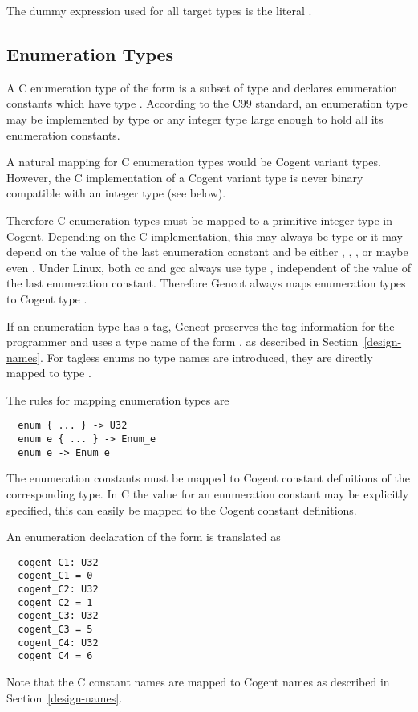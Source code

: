 The dummy expression used for all target types is the literal .

\subsection{Enumeration Types}
\label{design-types-enum}

A C enumeration type of the form  is a subset of type  and declares enumeration 
constants which have type . According to the C99 standard, an enumeration type may be implemented
by type  or any integer type large enough to hold all its enumeration constants.

A natural mapping for C enumeration types would be Cogent variant types. However, the C implementation
of a Cogent variant type is never binary compatible with an integer type (see below). 

Therefore C enumeration types must be mapped to a primitive integer type in Cogent. Depending on the C
implementation, this may always be type  or it may depend on the value of the last enumeration
constant and be either , , , or maybe even . Under Linux, both cc
and gcc always use type , independent of the value of the last enumeration constant. 
Therefore Gencot always maps enumeration types to Cogent type .

If an enumeration type has a tag, Gencot preserves the tag information for the programmer and uses
a type name of the form , as described in Section~\ref{design-names}. For tagless enums
no type names are introduced, they are directly mapped to type .

The rules for mapping enumeration types are
\begin{verbatim}
  enum { ... } -> U32
  enum e { ... } -> Enum_e
  enum e -> Enum_e
\end{verbatim}

The enumeration constants must be mapped to Cogent constant definitions of the corresponding type. In 
C the value for an enumeration constant may be explicitly specified, this can easily be mapped to
the Cogent constant definitions.

An enumeration declaration of the form  is translated as
\begin{verbatim}
  cogent_C1: U32
  cogent_C1 = 0
  cogent_C2: U32
  cogent_C2 = 1
  cogent_C3: U32
  cogent_C3 = 5
  cogent_C4: U32
  cogent_C4 = 6
\end{verbatim}
Note that the C constant names are mapped to Cogent names as described in Section~\ref{design-names}.

